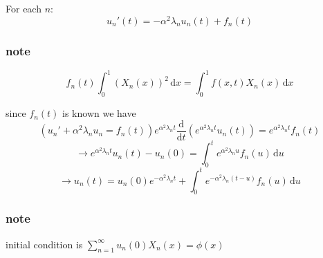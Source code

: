\documentclass{article}
\begin{document}
For each $n$:
\[{u_n}'(t)=-\alpha^2\lambda_nu_n(t)+f_n(t)\]

\subsubsection*{note}
\[f_n(t)\int_0^1{(X_n(x))^2\,\mathrm{d}x}=\int_0^1{f(x,t)X_n(x)\,\mathrm{d}x}\]

since $f_n(t)$ is known we have
\[({u_n}'+\alpha^2\lambda_nu_n=f_n(t))e^{\alpha^2\lambda_nt}\frac{\mathrm{d}}{\mathrm{d}t}\left(e^{\alpha^2\lambda_nt}u_n(t)\right)=e^{\alpha^2\lambda_nt}f_n(t)\]
\[\to e^{\alpha^2\lambda_nt}u_n(t)-u_n(0)=\int_0^t{e^{\alpha^2\lambda_n u}f_n(u)\,\mathrm{d}u}\]
\[\to u_n(t)=u_n(0)e^{-\alpha^2\lambda_nt}+\int_0^t{e^{-\alpha^2\lambda_n(t-u)}f_n(u)\,\mathrm{d}u}\]
\subsubsection*{note}
initial condition is $\sum\limits_{n=1}^\infty{u_n(0)X_n(x)}=\phi(x)$
\end{document}
